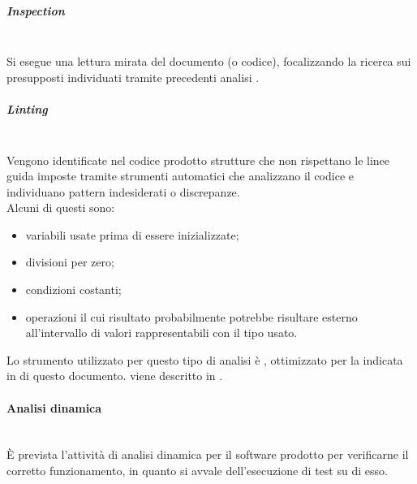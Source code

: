 \subparagraph{Inspection} \mbox{}\\
Si esegue una lettura mirata del documento (o codice), focalizzando la ricerca sui presupposti individuati tramite precedenti analisi .

\subparagraph{Linting}\mbox{}\\
Vengono identificate nel codice prodotto strutture che non rispettano le linee guida imposte tramite strumenti automatici che analizzano il codice e individuano pattern indesiderati o discrepanze.\\
Alcuni di questi sono:\begin{itemize}
	\item variabili usate prima di essere inizializzate;  
	\item divisioni per zero;
	\item condizioni costanti;
	\item operazioni il cui risultato probabilmente potrebbe risultare esterno all'intervallo di valori rappresentabili con il tipo usato.
\end{itemize}
Lo strumento utilizzato per questo tipo di analisi è , ottimizzato per la  indicata in  di questo documento.  viene descritto in .

\paragraph{Analisi dinamica}\mbox{}\\
\`{E} prevista l’attività di analisi dinamica per il software prodotto per verificarne il corretto funzionamento, in quanto si avvale dell'esecuzione di test su di esso.